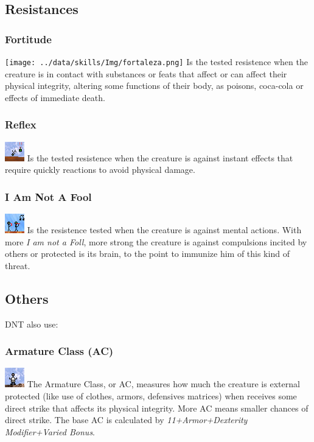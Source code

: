 \documentclass[ letterpaper,12pt]{article}
\begin{document}
\subsection{Resistances}

\subsubsection{Fortitude}
\texttt{[image: ../data/skills/Img/fortaleza.png]}
Is the tested resistence when the creature is in contact with substances or feats that affect or can affect their physical integrity, altering some functions of their body, as poisons, coca-cola or effects of immediate death.

\subsubsection{Reflex}
\includegraphics{../data/skills/Img/reflexos.png}
Is the tested resistence when the creature is against instant effects that require quickly reactions to avoid physical damage.

\subsubsection{I Am Not A Fool}
\includegraphics{../data/skills/Img/vontade.png}
Is the resistence tested when the creature is against mental actions. With more {\it I am not a Foll}, more strong the creature is against compulsions incited by others or protected is its brain, to the point to immunize him of this kind of threat.

\subsection{Others}
DNT also use:

\subsubsection{Armature Class (AC)}
\includegraphics{../data/skills/Img/ca.png}
The Armature Class, or AC, measures how much the creature is external protected (like use of clothes, armors, defensives matrices) when receives some direct strike that affects its physical integrity. More AC means smaller chances of direct strike. The base AC is calculated by {\it 11+Armor+Dexterity Modifier+Varied Bonus}.
\end{document}
